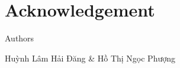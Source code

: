 \chapter{Acknowledgement}






\begin{flushright}
\begin{minipage}{8cm}
\centering
Authors

Huỳnh Lâm Hải Đăng \& Hồ Thị Ngọc Phượng
\end{minipage}
\end{flushright}